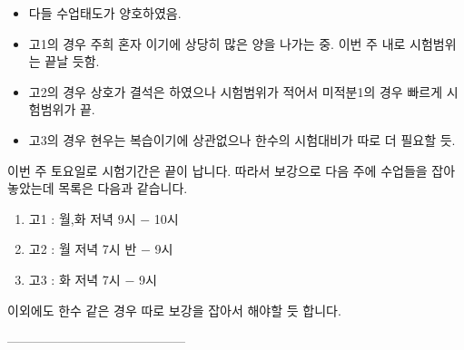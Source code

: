 \documentclass[idxtotoc,hyperref,openany]{labbook} %
\begin{document}

\begin{itemize}
	\item 다들 수업태도가 양호하였음.
	\item 고1의 경우 주희 혼자 이기에 상당히 많은 양을 나가는 중. 이번 주 내로 시험범위는 끝날 듯함.
	\item 고2의 경우 상호가 결석은 하였으나 시험범위가 적어서 미적분1의 경우 빠르게 시험범위가 끝.
	\item 고3의 경우 현우는 복습이기에 상관없으나 한수의 시험대비가 따로 더 필요할 듯.
\end{itemize}



이번 주 토요일로 시험기간은 끝이 납니다. 따라서 보강으로 다음 주에 수업들을 잡아 놓았는데 목록은 다음과 같습니다.
\begin{enumerate}
 \item 고1 : 월,화 저녁 9시 $-$ 10시
 \item 고2 : 월 저녁 7시 반 $-$ 9시
 \item 고3 : 화 저녁 7시 $-$ 9시
\end{enumerate}

이외에도 한수 같은 경우 따로 보강을 잡아서 해야할 듯 합니다.




------------------------------------------










\end{document}
